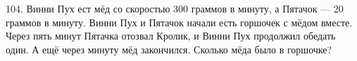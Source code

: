 104. Винни Пух ест мёд со скоростью 300 граммов в минуту, а Пятачок --- 20 граммов в минуту. Винни Пух и Пятачок начали есть горшочек с мёдом вместе. Через пять минут Пятачка отозвал Кролик, и Винни Пух продолжил обедать один. А ещё через минуту мёд закончился. Сколько мёда было в горшочке?\\
